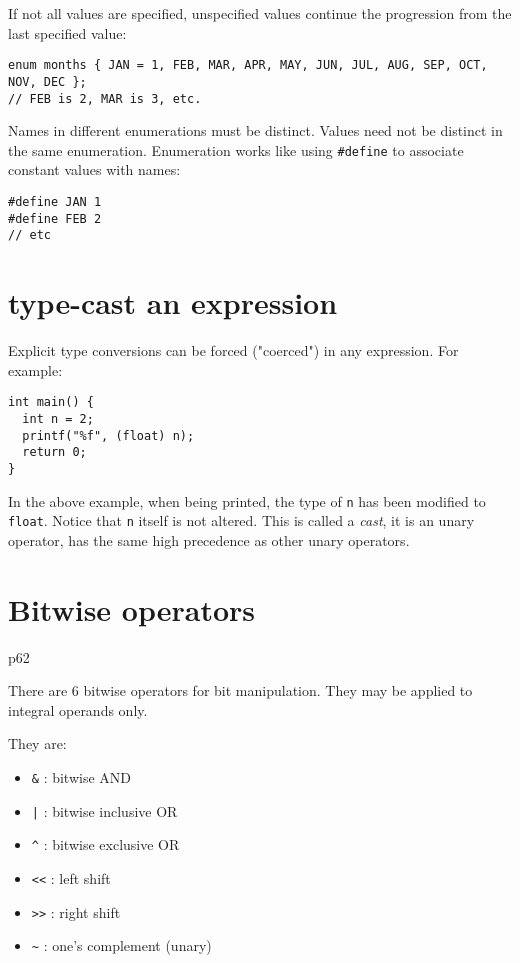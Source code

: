 \documentclass[12pt]{article}
\begin{document}
If not all values are specified, unspecified values continue the progression from the last specified value:
\begin{verbatim}
enum months { JAN = 1, FEB, MAR, APR, MAY, JUN, JUL, AUG, SEP, OCT, NOV, DEC };
// FEB is 2, MAR is 3, etc.
\end{verbatim}

Names in different enumerations must be distinct. Values need not be distinct in the same enumeration. Enumeration works like using \texttt{\#define} to associate constant values with names:
\begin{verbatim}
#define JAN 1
#define FEB 2
// etc
\end{verbatim}
\section{type-cast an expression}
\label{sec:org9cb07d0}
Explicit type conversions can be forced ("coerced") in any expression. For example:
\begin{verbatim}
int main() {
  int n = 2;
  printf("%f", (float) n);
  return 0;
}
\end{verbatim}
In the above example, when being printed, the type of \texttt{n} has been modified to \texttt{float}. Notice that \texttt{n} itself is not altered. This is called a \emph{cast}, it is an unary operator, has the same high precedence as other unary operators.
\section{Bitwise operators}
\label{sec:org55aa24e}
p62

There are 6 bitwise operators for bit manipulation. They may be applied to integral operands only.

They are:
\begin{itemize}
\item \texttt{\&}  : bitwise AND
\item \texttt{|}  : bitwise inclusive OR
\item \texttt{\textasciicircum{}}  : bitwise exclusive OR
\item \texttt{<<} : left shift
\item \texttt{>>} : right shift
\item \texttt{\textasciitilde{}}  : one's complement (unary)
\end{itemize}
\end{document}
